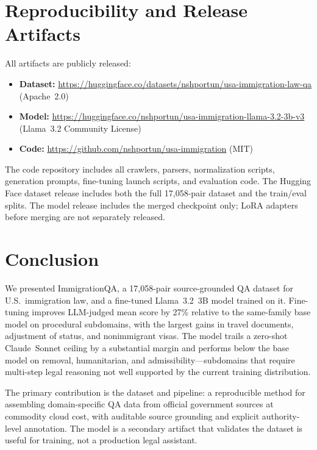 \documentclass[11pt]{article}
\begin{document}
\section{Reproducibility and Release Artifacts}
\label{sec:release}

All artifacts are publicly released:
\begin{itemize}[nosep]
  \item \textbf{Dataset:} \url{https://huggingface.co/datasets/nshportun/usa-immigration-law-qa} (Apache~2.0)
  \item \textbf{Model:} \url{https://huggingface.co/nshportun/usa-immigration-llama-3.2-3b-v3} (Llama~3.2 Community License)
  \item \textbf{Code:} \url{https://github.com/nshportun/usa-immigration} (MIT)
\end{itemize}

The code repository includes all crawlers, parsers, normalization scripts, generation prompts, fine-tuning launch scripts, and evaluation code. The Hugging Face dataset release includes both the full 17,058-pair dataset and the train/eval splits. The model release includes the merged checkpoint only; LoRA adapters before merging are not separately released.

\section{Conclusion}
\label{sec:conclusion}

We presented ImmigrationQA, a 17,058-pair source-grounded QA dataset for U.S.\ immigration law, and a fine-tuned Llama~3.2~3B model trained on it. Fine-tuning improves LLM-judged mean score by 27\% relative to the same-family base model on procedural subdomains, with the largest gains in travel documents, adjustment of status, and nonimmigrant visas. The model trails a zero-shot Claude~Sonnet ceiling by a substantial margin and performs below the base model on removal, humanitarian, and admissibility---subdomains that require multi-step legal reasoning not well supported by the current training distribution.

The primary contribution is the dataset and pipeline: a reproducible method for assembling domain-specific QA data from official government sources at commodity cloud cost, with auditable source grounding and explicit authority-level annotation. The model is a secondary artifact that validates the dataset is useful for training, not a production legal assistant.
\end{document}

